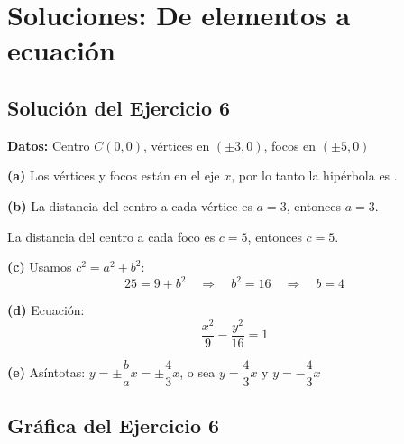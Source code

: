 \documentclass[12pt,a4paper]{article}
\begin{document}
	\section{Soluciones: De elementos a ecuación}

	\subsection*{Solución del Ejercicio 6}

	\textbf{Datos:} Centro $C(0,0)$, vértices en $(\pm 3,0)$, focos en $(\pm 5,0)$

	\bigskip

	\textbf{(a)} Los vértices y focos están en el eje $x$, por lo tanto la hipérbola es .

	\textbf{(b)} La distancia del centro a cada vértice es $a=3$, entonces $\boxed{a=3}$.

	La distancia del centro a cada foco es $c=5$, entonces $\boxed{c=5}$.

	\textbf{(c)} Usamos $c^2=a^2+b^2$:
	\[
	25=9+b^2 \quad\Rightarrow\quad b^2=16 \quad\Rightarrow\quad \boxed{b=4}
	\]

	\textbf{(d)} Ecuación:
	\[
	\boxed{\frac{x^2}{9}-\frac{y^2}{16}=1}
	\]

	\textbf{(e)} Asíntotas: $y=\pm\dfrac{b}{a}x=\pm\dfrac{4}{3}x$, o sea $\boxed{y=\dfrac{4}{3}x\text{ y }y=-\dfrac{4}{3}x}$

	\subsection*{Gráfica del Ejercicio 6}
\end{document}
